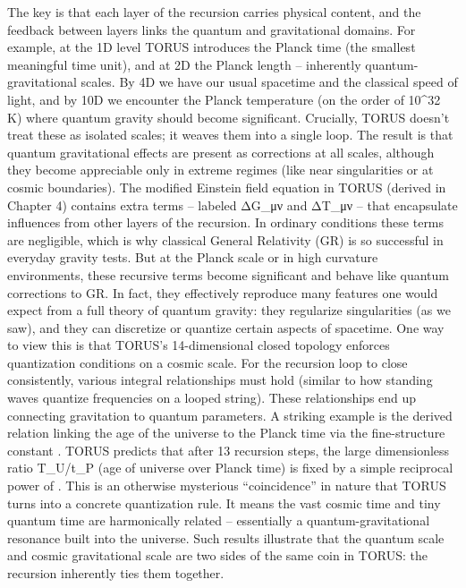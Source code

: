 \documentclass[
]{article}
\begin{document}
The key is that each layer of the recursion carries physical content,
and the feedback between layers links the quantum and gravitational
domains. For example, at the 1D level TORUS introduces the Planck time
(the smallest meaningful time unit), and at 2D the Planck length --
inherently quantum-gravitational scales. By 4D we have our usual
spacetime and the classical speed of light, and by 10D we encounter the
Planck temperature (on the order of 10\^{}32 K) where quantum gravity
should become significant. Crucially, TORUS doesn't treat these as
isolated scales; it weaves them into a single loop. The result is that
quantum gravitational effects are present as corrections at all scales,
although they become appreciable only in extreme regimes (like near
singularities or at cosmic boundaries). The modified Einstein field
equation in TORUS (derived in Chapter 4) contains extra terms -- labeled
ΔG\_μν and ΔT\_μν -- that encapsulate influences from other layers of
the recursion. In ordinary conditions these terms are negligible, which
is why classical General Relativity (GR) is so successful in everyday
gravity tests. But at the Planck scale or in high curvature
environments, these recursive terms become significant and behave like
quantum corrections to GR. In fact, they effectively reproduce many
features one would expect from a full theory of quantum gravity: they
regularize singularities (as we saw), and they can discretize or
quantize certain aspects of spacetime. One way to view this is that
TORUS's 14-dimensional closed topology enforces quantization conditions
on a cosmic scale. For the recursion loop to close consistently, various
integral relationships must hold (similar to how standing waves quantize
frequencies on a looped string). These relationships end up connecting
gravitation to quantum parameters. A striking example is the derived
relation linking the age of the universe to the Planck time via the
fine-structure constant \alpha. TORUS predicts that after 13 recursion steps,
the large dimensionless ratio T\_U/t\_P (age of universe over Planck
time) is fixed by a simple reciprocal power of \alpha. This is an otherwise
mysterious ``coincidence'' in nature that TORUS turns into a concrete
quantization rule. It means the vast cosmic time and tiny quantum time
are harmonically related -- essentially a quantum-gravitational
resonance built into the universe. Such results illustrate that the
quantum scale and cosmic gravitational scale are two sides of the same
coin in TORUS: the recursion inherently ties them together.
\end{document}
